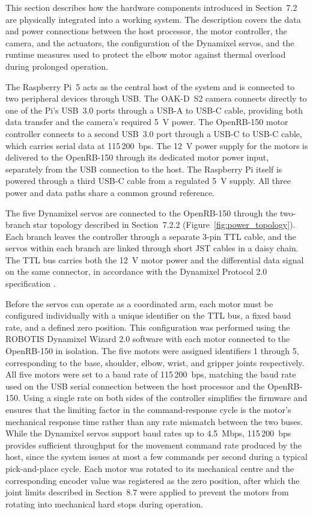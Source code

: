 This section describes how the hardware components introduced in 
Section~7.2 are physically integrated into a working system. The 
description covers the data and power connections between the host 
processor, the motor controller, the camera, and the actuators, the 
configuration of the Dynamixel servos, and the runtime measures used 
to protect the elbow motor against thermal overload during 
prolonged operation.

The Raspberry Pi~5 acts as the central host of the system and is 
connected to two peripheral devices through USB. The OAK-D~S2 
camera connects directly to one of the Pi's USB~3.0 ports through 
a USB-A to USB-C cable, providing both data transfer and the 
camera's required 5~V power. The OpenRB-150 motor controller connects to a second USB~3.0 port 
through a USB-C to USB-C cable, which carries serial data at 
115\,200~bps. The 12~V power supply for the 
motors is delivered to the OpenRB-150 through its dedicated motor 
power input, separately from the USB connection to the host. The 
Raspberry Pi itself is powered through a third USB-C cable from a 
regulated 5~V supply. All three power and data paths share a 
common ground reference.

The five Dynamixel servos are connected to the OpenRB-150 through 
the two-branch star topology described in Section~7.2.2 
(Figure~\ref{fig:power_topology}). Each branch leaves the controller 
through a separate 3-pin TTL cable, and the servos within each 
branch are linked through short JST cables in a daisy chain. The 
TTL bus carries both the 12~V motor power and the differential 
data signal on the same connector, in accordance with the 
Dynamixel Protocol 2.0 specification \cite{robotis_dynamixel}.

Before the servos can operate as a coordinated arm, each motor 
must be configured individually with a unique identifier on the 
TTL bus, a fixed baud rate, and a defined zero position. This 
configuration was performed using the ROBOTIS Dynamixel Wizard 
2.0 software with each motor connected to the OpenRB-150 in 
isolation. The five motors were assigned identifiers 1 through 5, 
corresponding to the base, shoulder, elbow, wrist, and gripper 
joints respectively. All five motors were set to a baud rate of 115\,200~bps, matching 
the baud rate used on the USB serial connection between the host 
processor and the OpenRB-150. Using a single rate on both sides 
of the controller simplifies the firmware and ensures that the 
limiting factor in the command-response cycle is the motor's 
mechanical response time rather than any rate mismatch between 
the two buses. While the Dynamixel servos support baud rates up 
to 4.5~Mbps, 115\,200~bps provides sufficient throughput for the 
movement command rate produced by the host, since the system 
issues at most a few commands per second during a typical 
pick-and-place cycle. Each motor 
was rotated to its mechanical centre and the corresponding encoder 
value was registered as the zero position, after which the joint 
limits described in Section~8.7 were applied to prevent 
the motors from rotating into mechanical hard stops during 
operation.

